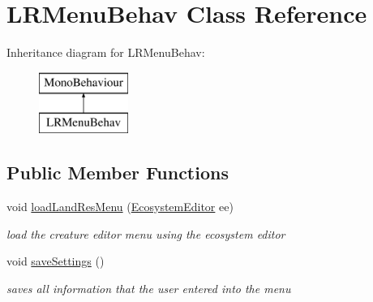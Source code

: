 \hypertarget{class_l_r_menu_behav}{}\section{L\+R\+Menu\+Behav Class Reference}
\label{class_l_r_menu_behav}
Inheritance diagram for L\+R\+Menu\+Behav\+:\begin{figure}[H]
\begin{center}
\leavevmode
\includegraphics[height=2.000000cm]{class_l_r_menu_behav}
\end{center}
\end{figure}
\subsection*{Public Member Functions}
\begin{DoxyCompactItemize}
\item 
void \mbox{\hyperlink{class_l_r_menu_behav_afac347dc845bbc5907d7f113a5ab83a6}{load\+Land\+Res\+Menu}} (\mbox{\hyperlink{class_ecosystem_editor}{Ecosystem\+Editor}} ee)
\begin{DoxyCompactList}\small\item\em load the creature editor menu using the ecosystem editor \end{DoxyCompactList}\item 
void \mbox{\hyperlink{class_l_r_menu_behav_ae018bba40d93916f0b390dff34071506}{save\+Settings}} ()
\begin{DoxyCompactList}\small\item\em saves all information that the user entered into the menu \end{DoxyCompactList}\end{DoxyCompactItemize}
